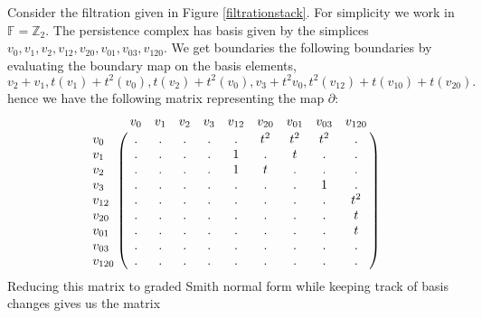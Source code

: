 \begin{example}\label{bddreduce}
Consider the filtration given in Figure \ref{filtrationstack}. For simplicity we work in $\mathbb{F}=\mathbb{Z}_{2}$. The persistence complex has basis given by the simplices $v_{0},v_{1},v_{2},v_{12},v_{20},v_{01},v_{03},v_{120}$. We get boundaries the following boundaries by evaluating the boundary map on the basis elements, \[v_{2}+v_{1},t(v_{1})+t^{2}(v_{0}),t(v_{2})+t^{2}(v_{0}),v_{3}+t^{2}v_{0}, t^{2}(v_{12})+t(v_{10})+t(v_{20}).\]
hence we have the following matrix representing the map $\partial$:
\[
  \bordermatrix{
    & v_{0} & v_{1} & v_{2} & v_{3} & v_{12} & v_{20} & v_{01} & v_{03} & v_{120}\cr
    v_{0}  &.&.&.&.&.&t^{2}&t^{2}&t^{2}&.\cr
    v_{1}  &.&.&.&.&1&.&t&.&.\cr
    v_{2}  &.&.&.&.&1&t&.&.&.\cr
    v_{3}  &.&.&.&.&.&.&.&1&.\cr
    v_{12} &.&.&.&.&.&.&.&.&t^{2}\cr
    v_{20} &.&.&.&.&.&.&.&.&t\cr
    v_{01} &.&.&.&.&.&.&.&.&t\cr
    v_{03} &.&.&.&.&.&.&.&.&.\cr
    v_{120}&.&.&.&.&.&.&.&.&.
    }
  \]
  Reducing this matrix to graded Smith normal form while keeping track of basis changes gives us the matrix




\end{example}
